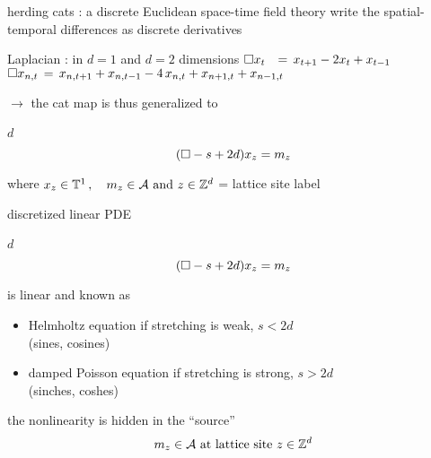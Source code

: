 \begin{frame}{herding cats : a discrete Euclidean space-time field theory}
write the spatial-temporal differences as discrete derivatives
\begin{block}{Laplacian : in $d=1$ and $d=2$ dimensions}
\(
\Box x_t \;\;\,=\, x_{t+1} - 2x_{t} + x_{t-1}
\)\\ \(
\Box x_{n,t} \,=\, x_{n,t+1} + x_{n,t-1}
- 4 \, x_{n,t} + x_{n+1,t} + x_{n-1, t}
\)
\end{block}

\medskip

$\to$ the cat map is thus generalized  to
\begin{block}{$d$\dmn\ \catlatt}
\[
 (\Box -s+2d)x_{z} = m_z
\] %

\medskip

\end{block}

\bigskip

where
\(
  x_{z} \in  \mathbb{T}^{1}
    \,, \quad
  {\ensuremath{m_{z}}} \in \mathcal{A}
    \mbox{  and  }
  z\in \mathbb{Z}^{d}
\) = lattice site label
\end{frame}

\begin{frame}{discretized linear PDE}
\begin{block}{$d$\dmn\ \catlatt}
\[
 (\Box -s+2d)x_{z} = m_z
\] %

\medskip
\end{block}

\bigskip

is linear and known as
\begin{itemize}
\item Helmholtz equation if stretching is weak, $s<2d$ \\ (sines, cosines)
\item damped Poisson equation if stretching is strong, $s>2d$ \\ (sinches, coshes)
\end{itemize}
the nonlinearity is hidden in the ``source''
\[
  {m_{z}} \in \mathcal{A}
    \mbox{  at lattice site  }
  z\in \mathbb{Z}^{d}
\]
\end{frame}

\newcommand{\D}{\mathcal{D}}
\newcommand{\gd}{\mathsf{g}}

